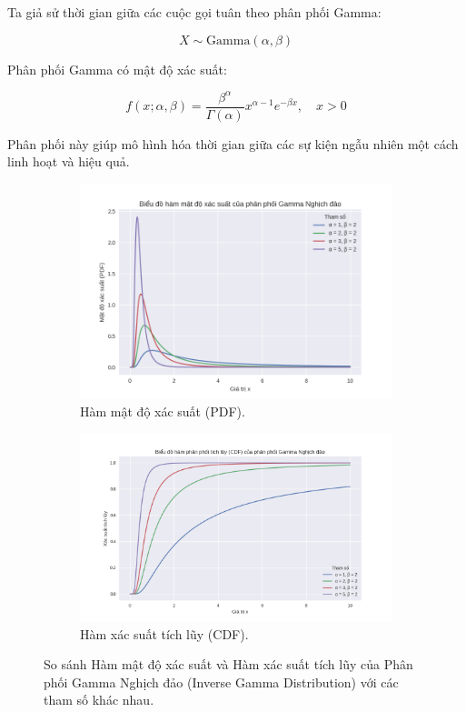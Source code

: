 	Ta giả sử thời gian giữa các cuộc gọi tuân theo phân phối Gamma:

	\[
	X \sim \text{Gamma}(\alpha, \beta)
	\]

	Phân phối Gamma có mật độ xác suất:

	\[
	f(x; \alpha, \beta) = \frac{\beta^\alpha}{\Gamma(\alpha)} x^{\alpha - 1} e^{-\beta x}, \quad x > 0
	\]

	Phân phối này giúp mô hình hóa thời gian giữa các sự kiện ngẫu nhiên một cách linh hoạt và hiệu quả.
	\begin{figure}[h!]
		\centering
		
		\begin{subfigure}[b]{0.49\textwidth}
			\centering
			\includegraphics[width=\textwidth]{images/Inverse Gamma Distribution-PDF.png}
			\caption{Hàm mật độ xác suất (PDF).}
			\label{fig:InverseGamma-PDF}
		\end{subfigure}
		\hfill 
		\begin{subfigure}[b]{0.49\textwidth}
			\centering
			\includegraphics[width=\textwidth]{images/Inverse Gamma Distribution-CDF.png}
			\caption{Hàm xác suất tích lũy (CDF).}
			\label{fig:InverseGamma-CDF}
		\end{subfigure}
		
		\caption{So sánh Hàm mật độ xác suất và Hàm xác suất tích lũy của Phân phối Gamma Nghịch đảo (Inverse Gamma Distribution) với các tham số khác nhau.}
		\label{fig:InverseGamma-Combined}
	\end{figure}
\newpage
